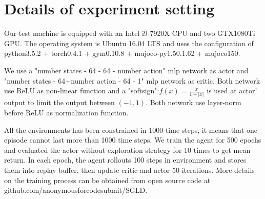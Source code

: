 \appendix
\setcounter{figure}{0}
\section{Details of experiment setting}
\label{apdx:detail}
Our test machine is equipped with an Intel i9-7920X CPU and two GTX1080Ti GPU. The operating system is Ubuntu 16.04 LTS and uses the configuration of python3.5.2 + torch0.4.1 + gym0.10.8 + mujoco-py1.50.1.62 + mujoco150.

We use a "number states - 64 - 64 - number action" mlp network as actor and "number states - 64+number action - 64 - 1" mlp network as critic. Both network use ReLU as non-linear function and a "softsign":$f(x)=\frac{x}{1+|x|}$ is used at actor' output to limit the output between $(-1,1)$. Both network use layer-norm before ReLU as normalization function.

All the environments has been constrained in 1000 time steps, it means that one episode cannot last more than 1000 time steps. We train the agent for 500 epochs and evaluated the actor without exploration strategy for 10 times to get mean return. In each epoch, the agent rollouts 100 steps in environment and stores them into replay buffer, then update critic and actor 50 iterations. More details on the training process can be obtained from open source code at github.com/anonymousforcodesubmit/SGLD.

